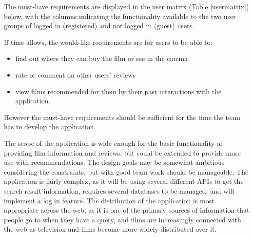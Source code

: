 \documentclass{sig-alt-release2}
\begin{document}
The must-have requirements are displayed in the user matrix (Table \ref{usermatrix}) below, with the columns indicating the functionality available to the two user groups of logged in (registered) and not logged in (guest) users.

\begin{table}[h]
\caption{User needs matrix}
\label{usermatrix}
\end{table}

If time allows, the would-like requirements are for users to be able to:
\begin{itemize}
\item find out where they can buy the film or see in the cinema
\item rate or comment on other users' reviews
\item view films recommended for them by their past interactions with the application.
\end{itemize}
However the must-have requirements should be sufficient for the time the team has to develop the application.


The scope of the application is wide enough for the basic functionality of providing film information and reviews, but could be extended to provide more use with recommendations. The design goals may be somewhat ambitious considering the constraints, but with good team work should be manageable. The application is fairly complex, as it will be using several different APIs to get the search result information, requires several databases to be managed, and will implement a log in feature. The distribution of the application is most appropriate across the web, as it is one of the primary sources of information that people go to when they have a query, and films are increasingly connected with the web as television and films become more widely distributed over it.
\end{document}
